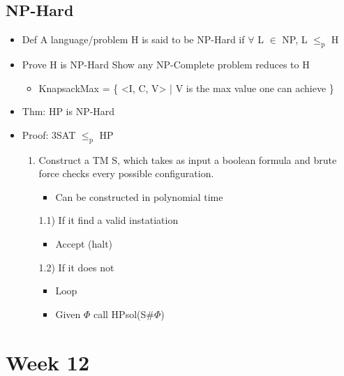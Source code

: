 \documentclass[11pt]{article}
\begin{document}
\subsection{NP-Hard}
\label{sec:orgb8c8e2c}
\begin{itemize}
\item Def
A language/problem H is said to be NP-Hard if \(\forall\) L \(\in\) NP, L \(\le_{\text{p}}\) H
\item Prove H is NP-Hard
Show any NP-Complete problem reduces to H
\begin{itemize}
\item KnapsackMax = \{ <I, C, V> | V is the max value one can achieve \}
\end{itemize}
\item Thm: HP is NP-Hard
\item Proof: 3SAT \(\le_{\text{p}}\) HP
\begin{enumerate}
\item Construct a TM S, which takes as input a boolean formula and brute force checks every possible configuration.
\begin{itemize}
\item Can be constructed in polynomial time
\end{itemize}
1.1) If it find a valid instatiation
\begin{itemize}
\item Accept (halt)
\end{itemize}
1.2) If it does not 
\begin{itemize}
\item Loop
\end{itemize}
\begin{itemize}
\item Given \(\Phi\) call HPsol(S\#\(\Phi\))
\end{itemize}
\end{enumerate}
\end{itemize}
\section{Week 12}
\label{sec:orgf070753}
\end{document}
